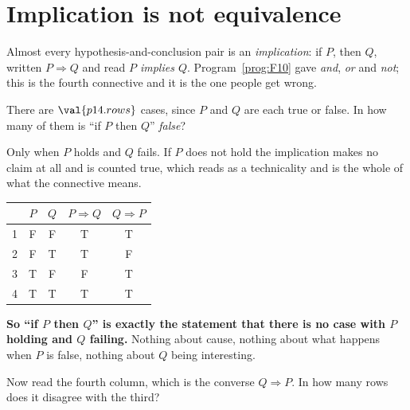 \section{Implication is not equivalence}
\label{sec:P14-implication}

\begin{fr}
Almost every hypothesis-and-conclusion pair is an \emph{implication}: if $P$,
then $Q$, written $P \Rightarrow Q$ and read \emph{$P$ implies $Q$}.
Program~\ref{prog:F10} gave \emph{and}, \emph{or} and \emph{not}; this is the
fourth connective and it is the one people get wrong.

There are $\val{p14.rows}$ cases, since $P$ and $Q$ are each true or false.
In how many of them is \enquote{if $P$ then $Q$} \emph{false}?
\dotline
\nextframe
\end{fr}

\begin{fr}
Only when $P$ holds and $Q$ fails. If $P$ does not hold the implication makes
no claim at all and is counted true, which reads as a technicality and is the
whole of what the connective means.

\begin{center}
\begin{tabular}{ccccc}
\toprule
& $P$ & $Q$ & $P \Rightarrow Q$ & $Q \Rightarrow P$ \\
\midrule
1 & F & F & T & T \\
2 & F & T & T & F \\
3 & T & F & F & T \\
4 & T & T & T & T \\
\bottomrule
\end{tabular}
\end{center}

\textbf{So \enquote{if $P$ then $Q$} is exactly the statement that there is no
case with $P$ holding and $Q$ failing.} Nothing about cause, nothing about
what happens when $P$ is false, nothing about $Q$ being interesting.

Now read the fourth column, which is the converse $Q \Rightarrow P$. In how
many rows does it disagree with the third?
\nextframe
\end{fr}

